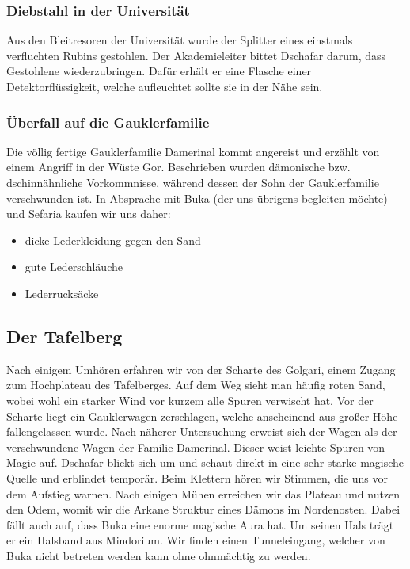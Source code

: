 \hypertarget{diebstahl-in-der-universituxe4t}{%
\subsubsection{Diebstahl in der
Universität}\label{diebstahl-in-der-universituxe4t}}

Aus den Bleitresoren der Universität wurde der Splitter eines einstmals
verfluchten Rubins gestohlen. Der Akademieleiter bittet Dschafar darum,
dass Gestohlene wiederzubringen. Dafür erhält er eine Flasche einer
Detektorflüssigkeit, welche aufleuchtet sollte sie in der Nähe sein.

\hypertarget{uxfcberfall-auf-die-gauklerfamilie}{%
\subsubsection{Überfall auf die
Gauklerfamilie}\label{uxfcberfall-auf-die-gauklerfamilie}}

Die völlig fertige Gauklerfamilie Damerinal kommt angereist und erzählt
von einem Angriff in der Wüste Gor. Beschrieben wurden dämonische bzw.
dschinnähnliche Vorkommnisse, während dessen der Sohn der Gauklerfamilie
verschwunden ist. In Absprache mit Buka (der uns übrigens begleiten
möchte) und Sefaria kaufen wir uns daher:

\begin{itemize}
\tightlist
\item
  dicke Lederkleidung gegen den Sand
\item
  gute Lederschläuche
\item
  Lederrucksäcke
\end{itemize}

\hypertarget{der-tafelberg}{%
\subsection{Der Tafelberg}\label{der-tafelberg}}

Nach einigem Umhören erfahren wir von der Scharte des Golgari, einem
Zugang zum Hochplateau des Tafelberges. Auf dem Weg sieht man häufig
roten Sand, wobei wohl ein starker Wind vor kurzem alle Spuren verwischt
hat. Vor der Scharte liegt ein Gauklerwagen zerschlagen, welche
anscheinend aus großer Höhe fallengelassen wurde. Nach näherer
Untersuchung erweist sich der Wagen als der verschwundene Wagen der
Familie Damerinal. Dieser weist leichte Spuren von Magie auf. Dschafar
blickt sich um und schaut direkt in eine sehr starke magische Quelle und
erblindet temporär. Beim Klettern hören wir Stimmen, die uns vor dem
Aufstieg warnen. Nach einigen Mühen erreichen wir das Plateau und nutzen
den Odem, womit wir die Arkane Struktur eines Dämons im Nordenosten.
Dabei fällt auch auf, dass Buka eine enorme magische Aura hat. Um seinen
Hals trägt er ein Halsband aus Mindorium. Wir finden einen
Tunneleingang, welcher von Buka nicht betreten werden kann ohne
ohnmächtig zu werden.

